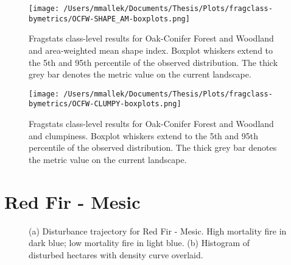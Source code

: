 \begin{figure}[!htbp]
\centering
    \texttt{[image: /Users/mmallek/Documents/Thesis/Plots/fragclass-bymetrics/OCFW-SHAPE\_AM-boxplots.png]}
  \caption{Fragstats class-level results for Oak-Conifer Forest and Woodland and area-weighted mean shape index. Boxplot whiskers extend to the 5th and 95th percentile of the observed distribution. The thick grey bar denotes the metric value on the current landscape.}
  \label{fig:ocfw_shapeam}
\end{figure}


\begin{figure}[!htbp]
\centering
    \texttt{[image: /Users/mmallek/Documents/Thesis/Plots/fragclass-bymetrics/OCFW-CLUMPY-boxplots.png]}
  \caption{Fragstats class-level results for Oak-Conifer Forest and Woodland and clumpiness. Boxplot whiskers extend to the 5th and 95th percentile of the observed distribution. The thick grey bar denotes the metric value on the current landscape.}
  \label{fig:ocfw_clumpy}
\end{figure}



\clearpage
\section{Red Fir - Mesic} 

\begin{figure}[!htbp]
  \centering
  \caption{\small (a) Disturbance trajectory for Red Fir - Mesic. High mortality fire in dark blue; low mortality fire in light blue. (b) Histogram of disturbed hectares with density curve overlaid.} 
  \label{fig:darea_rfrm}
\end{figure}

